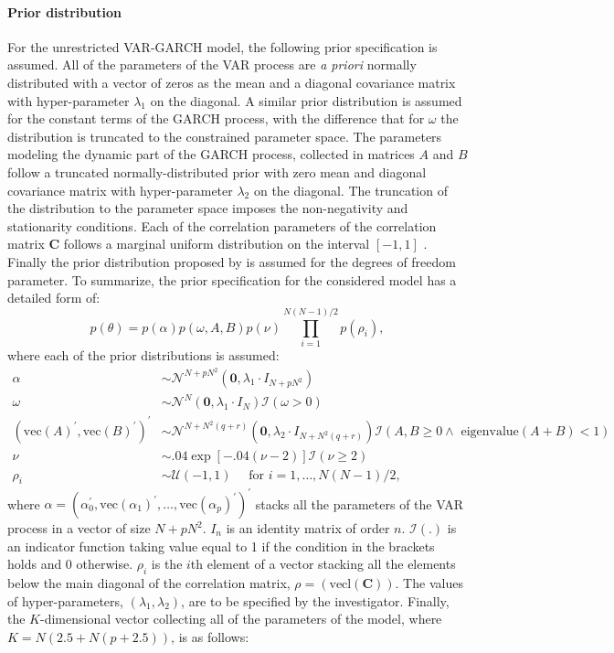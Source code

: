 \documentclass[final,3p,authoryear]{elsarticle}
\begin{document}
 \paragraph{Prior distribution}
 For the unrestricted VAR-GARCH model, the following prior specification is assumed. All of the parameters of the VAR process are \emph{a priori} normally distributed with a vector of zeros as the mean and a diagonal covariance matrix with hyper-parameter $\lambda_1$ on the diagonal. A similar prior distribution is assumed for the constant terms of the GARCH process, with the difference that for $\omega$ the distribution is truncated to the constrained parameter space. The parameters modeling the dynamic part of the GARCH process, collected in matrices $A$ and $B$ follow a truncated normally-distributed prior with zero mean and diagonal covariance matrix with hyper-parameter $\lambda_2$ on the diagonal. The truncation of the distribution to the parameter space imposes the non-negativity and stationarity conditions. Each of the correlation parameters of the correlation matrix $\mathbf{C}$ follows a marginal uniform distribution on the interval $[-1,1]$ \citep[see][for the implications of assuming such a marginal prior distribution for the joint distribution of the correlation matrix]{Barnard2000}. Finally the prior distribution proposed by \cite{Deschamps2006} is assumed for the degrees of freedom parameter. To summarize, the prior specification for the considered model has a detailed form of:
\begin{equation}\label{eq:prior}
p(\theta) = p(\alpha)p(\omega,A,B)p(\nu)\prod_{i=1}^{N(N-1)/2}p(\rho_i),
\end{equation}
where each of the prior distributions is assumed:
\begin{align*}
\alpha &\sim \mathcal{N}^{N+pN^2}\left( \mathbf{0}, \lambda_1\cdot I_{N+pN^2} \right)\\
\omega &\sim \mathcal{N}^{N}\left( \mathbf{0}, \lambda_1\cdot I_{N} \right) \mathcal{I}(\omega>0)\\
\left(\text{vec}(A)^{\prime},\text{vec}(B)^{\prime}\right)^{\prime} &\sim \mathcal{N}^{N+N^2(q+r)}\left( \mathbf{0}, \lambda_2\cdot I_{N+N^2(q+r)} \right) \mathcal{I}\left(A,B\geq 0\land \text{ eigenvalue}(A+B)<1\right)\\
\nu &\sim .04 \exp\left[-.04(\nu - 2) \right]\mathcal{I}(\nu\geq 2)\\
\rho_i &\sim \mathcal{U}(-1, 1) \quad \text{ for } i=1,\dots,N(N-1)/2,
\end{align*}
where $\alpha = (\alpha_{0}^{\prime}, \text{vec}(\alpha_1)^{\prime}, \dots, \text{vec}(\alpha_p)^{\prime})^{\prime}$ stacks all the parameters of the VAR process in a vector of size $N+pN^2$. $I_n$ is an identity matrix of order $n$. $\mathcal{I}(.)$ is an indicator function taking value equal to 1 if the condition in the brackets holds and 0 otherwise. $\rho_i$ is the $i$th element of a vector stacking all the elements below the main diagonal of the correlation matrix, $\rho = (\text{vecl}(\mathbf{C}))$. The values of hyper-parameters, $(\lambda_1,\lambda_2)$, are to be specified by the investigator. Finally, the $K$-dimensional vector collecting all of the parameters of the model, where $K=N(2.5+N(p + 2.5))$, is as follows:
\end{document}
